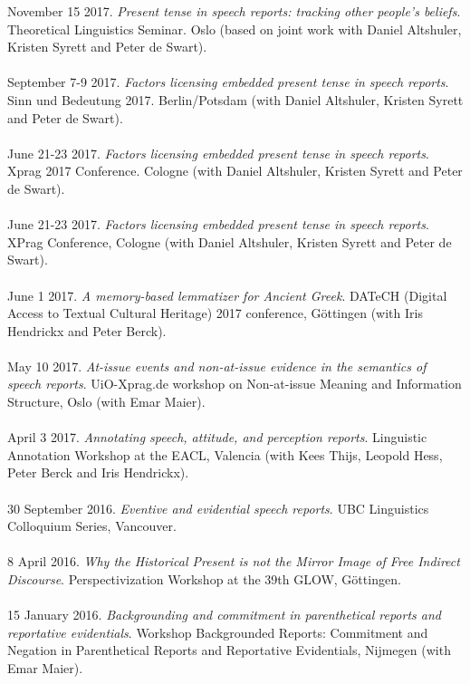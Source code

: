 \documentclass[a4paper,11pt]{article}
\begin{document}
November 15 2017. \emph{Present tense in speech reports: tracking other people's beliefs}. Theoretical Linguistics Seminar. Oslo (based on joint work with Daniel Altshuler, Kristen Syrett and Peter de Swart).\\\\
September 7-9 2017. \emph{Factors licensing embedded present tense in speech reports}. Sinn und Bedeutung 2017. Berlin/Potsdam (with Daniel Altshuler, Kristen Syrett and Peter de Swart).\\\\
June 21-23 2017. \emph{Factors licensing embedded present tense in speech reports}. Xprag 2017 Conference. Cologne (with Daniel Altshuler, Kristen Syrett and Peter de Swart).\\\\
June 21-23 2017. \emph{Factors licensing embedded present tense in speech reports}. XPrag Conference, Cologne (with Daniel Altshuler, Kristen Syrett and Peter de Swart).\\\\
June 1 2017. \emph{A memory-based lemmatizer for Ancient Greek}. DATeCH (Digital Access to Textual Cultural Heritage) 2017 conference, G\"ottingen (with Iris Hendrickx and Peter Berck).\\\\
May 10 2017. \emph{At-issue events and non-at-issue evidence in the semantics of speech reports}. UiO-Xprag.de workshop on Non-at-issue Meaning and Information Structure, Oslo (with Emar Maier).\\\\
April 3 2017.  \emph{Annotating speech, attitude, and perception reports}. Linguistic Annotation Workshop at the EACL, Valencia (with Kees Thijs, Leopold Hess, Peter Berck and Iris Hendrickx).\\\\
30 September 2016. \emph{Eventive and evidential speech reports}. UBC Linguistics Colloquium Series, Vancouver. \\\\
8 April 2016. \emph{Why the Historical Present is not the Mirror Image of Free Indirect Discourse}. Perspectivization Workshop at the 39th GLOW, G\"ottingen.\\\\
15 January 2016. \emph{Backgrounding and commitment in parenthetical reports and reportative evidentials}. Workshop Backgrounded Reports:
Commitment and Negation in Parenthetical Reports and Reportative Evidentials, Nijmegen (with Emar Maier).\\\\
\end{document}
